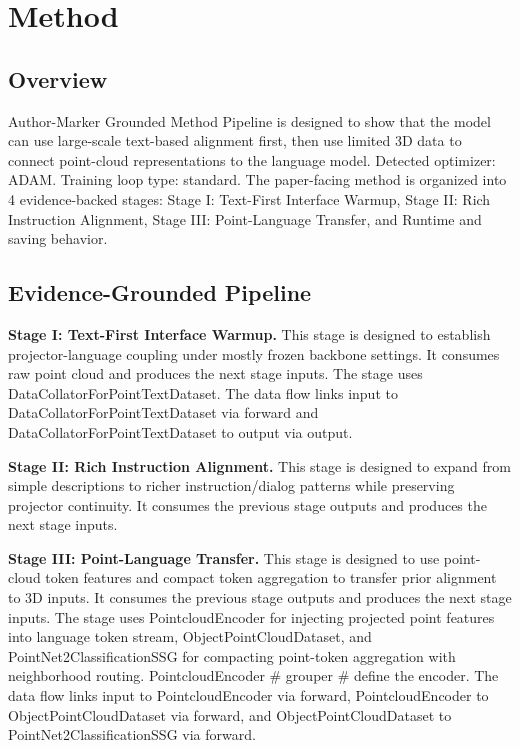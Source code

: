 \section{Method}

\subsection{Overview}
Author-Marker Grounded Method Pipeline is designed to show that the model can use large-scale text-based alignment first, then use limited 3D data to connect point-cloud representations to the language model. Detected optimizer: ADAM. Training loop type: standard. The paper-facing method is organized into 4 evidence-backed stages: Stage I: Text-First Interface Warmup, Stage II: Rich Instruction Alignment, Stage III: Point-Language Transfer, and Runtime and saving behavior.

\subsection{Evidence-Grounded Pipeline}
\textbf{Stage I: Text-First Interface Warmup.} This stage is designed to establish projector-language coupling under mostly frozen backbone settings. It consumes raw point cloud and produces the next stage inputs. The stage uses DataCollatorForPointTextDataset. The data flow links input to DataCollatorForPointTextDataset via forward and DataCollatorForPointTextDataset to output via output.

\textbf{Stage II: Rich Instruction Alignment.} This stage is designed to expand from simple descriptions to richer instruction/dialog patterns while preserving projector continuity. It consumes the previous stage outputs and produces the next stage inputs.

\textbf{Stage III: Point-Language Transfer.} This stage is designed to use point-cloud token features and compact token aggregation to transfer prior alignment to 3D inputs. It consumes the previous stage outputs and produces the next stage inputs. The stage uses PointcloudEncoder for injecting projected point features into language token stream, ObjectPointCloudDataset, and PointNet2ClassificationSSG for compacting point-token aggregation with neighborhood routing. PointcloudEncoder \# grouper \# define the encoder. The data flow links input to PointcloudEncoder via forward, PointcloudEncoder to ObjectPointCloudDataset via forward, and ObjectPointCloudDataset to PointNet2ClassificationSSG via forward.

